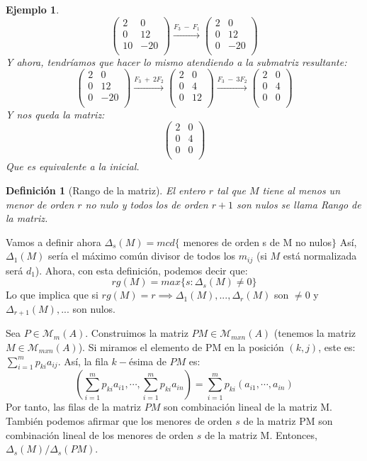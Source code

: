 \documentclass[11pt, a4paper, titlepage]{article}
\newif\IfInSansMode
\theoremstyle{theorem-style}
\theoremstyle{definition-style}
\newtheorem{ndef}{Definición}[section]
\theoremstyle{remark-style}
\theoremstyle{example-style}
\newtheorem{ejemplo}{Ejemplo}[section]
\begin{document}
\begin{ejemplo}
\[\begin{pmatrix}
 2 & 0 \\
 0 & 12\\
 10 & -20\\
\end{pmatrix} \xrightarrow{F_3\ -\ F_1}
\begin{pmatrix}
 2 & 0 \\
 0 & 12\\
 0 & -20\\
\end{pmatrix}
	\]
	Y ahora, tendríamos que hacer lo mismo atendiendo a la submatriz resultante:
	\[
	\begin{pmatrix}
 2 & 0 \\
 0 & 12 \\
 0 & -20 \\
\end{pmatrix}\xrightarrow{F_3\ +\ 2F_2}
\begin{pmatrix}
  2 & 0 \\
  0 & 4 \\
  0 & 12 \\
\end{pmatrix}\xrightarrow{F_3\ -\ 3F_2}
\begin{pmatrix}
  2 & 0 \\
  0 & 4 \\
  0 & 0 \\
\end{pmatrix}
	\]
	Y nos queda la matriz:
	\[
	\begin{pmatrix}
 2 & 0 \\
 0 & 4\\
 0 & 0\\
\end{pmatrix}
	\]
	Que es equivalente a la inicial.
\end{ejemplo}

\begin{ndef}[Rango de la matriz]
	El entero $r$ tal que $M$ tiene al menos un menor de orden $r$ no nulo y todos los de orden $r+1$ son nulos se llama Rango de la matriz.
\end{ndef}

Vamos a definir ahora $\Delta_s(M) = mcd\{$ menores de orden s de M no nulos$\}$
Así, $\Delta_1(M)$ sería el máximo común divisor de todos los $m_{ij}$ (si $M$ está normalizada será $d_1$). Ahora, con esta definición, podemos decir que:
\[
rg(M) = max\{s : \Delta_s(M) \ne 0\}
\]
Lo que implica que si $rg(M) = r \implies \Delta_1(M),...,\Delta_r(M)$ son $\ne 0$ y $\Delta_{r+1}(M),...$ son nulos.

Sea $P \in \mathcal{M}_m(A)$. Construimos la matriz $PM\in \mathcal{M}_{mxn}(A)$ (tenemos la matriz $M \in \mathcal{M}_{mxn}(A)$). Si miramos el elemento de PM en la posición $(k,j)$, este es: $\sum_{i=1}^m p_{ki}a_{ij}$. Así, la fila $k-$ésima de $PM$ es:
\[
(\sum_{i=1}^m p_{ki}a_{i1}, \cdots , \sum_{i=1}^m p_{ki}a_{in}) = \sum_{i=1}^m p_{ki}(a_{i1},\cdots , a_{in})
\]
Por tanto, las filas de la matriz $PM$ son combinación lineal de la matriz M. También podemos afirmar que los menores de orden $s$ de la matriz PM son combinación lineal de los menores de orden $s$ de la matriz M. Entonces, $\Delta_s(M)/\Delta_s(PM)$.
\end{document}
